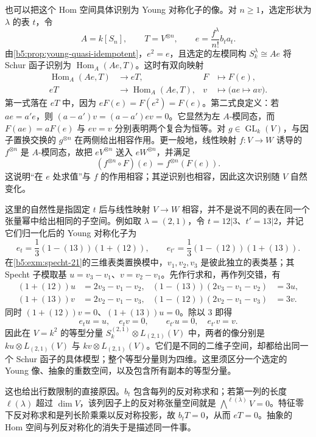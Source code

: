 \ProseParagraphBreak

也可以把这个 Hom 空间具体识别为 Young 对称化子的像。对 \(n\ge1\)，选定形状为 \(\lambda\) 的表 \(t\)，令
\[
	A=k[S_n],\qquad T=V^{\otimes n},\qquad e=\frac{f^\lambda}{n!}b_ta_t.
\]
由\cref{b5:prop:young-quasi-idempotent}，\(e^2=e\)，且选定的左模同构 \(S_k^\lambda\cong Ae\) 将 Schur 函子识别为 \(\operatorname{Hom}_A(Ae,T)\)。这时有双向映射
\[
	\begin{aligned}
		\operatorname{Hom}_A(Ae,T)&\longrightarrow eT, &F&\longmapsto F(e),\\
		eT&\longrightarrow\operatorname{Hom}_A(Ae,T), &v&\longmapsto\bigl(ae\longmapsto av\bigr).
	\end{aligned}
\]
第一式落在 \(eT\) 中，因为 \(eF(e)=F(e^2)=F(e)\)。第二式良定义：若 \(ae=a'e\)，则 \((a-a')v=(a-a')ev=0\)。它显然为左 \(A\)-模同态，而 \(F(ae)=aF(e)\) 与 \(ev=v\) 分别表明两个复合为恒等。对 \(g\in\operatorname{GL}_k(V)\)，与因子置换交换的 \(g^{\otimes n}\) 在两侧给出相容作用。更一般地，线性映射 \(f:V\to W\) 诱导的 \(f^{\otimes n}\) 是 \(A\)-模同态，故把 \(eV^{\otimes n}\) 送入 \(eW^{\otimes n}\)，并满足
\[
	(f^{\otimes n}\circ F)(e)=f^{\otimes n}(F(e)).
\]
这说明“在 \(e\) 处求值”与 \(f\) 的作用相容；其逆识别也相容，因此这次识别随 \(V\) 自然变化。

\ProseParagraphBreak

这里的自然性是指固定 \(t\) 后与线性映射 \(V\to W\) 相容，并不是说不同的表在同一个张量幂中给出相同的子空间。例如取 \(\lambda=(2,1)\)，令 \(t=12|3\)、\(t'=13|2\)，并记它们归一化后的 Young 对称化子为
\[
	e_t=\frac13(1-(13))(1+(12)),\qquad e_{t'}=\frac13(1-(12))(1+(13)).
\]
在\cref{b5:exm:specht-21}的三维表类置换模中，\(v_1,v_2,v_3\) 是彼此独立的表类基；其 Specht 子模取基 \(u=v_3-v_1\)、\(v=v_2-v_1\)。先作行求和，再作列交错，有
\[
	\begin{aligned}
		(1+(12))u&=2v_3-v_1-v_2,& (1-(13))(2v_3-v_1-v_2)&=3u,\\
		(1+(13))v&=2v_2-v_1-v_3,& (1-(12))(2v_2-v_1-v_3)&=3v.
	\end{aligned}
\]
同时 \((1+(12))v=0\)、\((1+(13))u=0\)。除以 \(3\) 即得
\[
	e_tu=u,\quad e_tv=0,\qquad e_{t'}u=0,\quad e_{t'}v=v.
\]
因此在 \(V=k^2\) 的等型分量 \(S_k^{(2,1)}\otimes L_{(2,1)}(V)\) 中，两者的像分别是 \(ku\otimes L_{(2,1)}(V)\) 与 \(kv\otimes L_{(2,1)}(V)\)。它们是不同的二维子空间，却都给出同一个 Schur 函子的具体模型；整个等型分量则为四维。这里须区分一个选定的 Young 像、抽象的重数空间，以及包含所有副本的等型分量。

\ProseParagraphBreak

这也给出行数限制的直接原因。\(b_t\) 包含每列的反对称求和；若第一列的长度 \(\ell(\lambda)\) 超过 \(\dim V\)，该列因子上的反对称张量空间就是 \(\bigwedge^{\ell(\lambda)}V=0\)。特征零下反对称求和是列长阶乘乘以反对称投影，故 \(b_tT=0\)，从而 \(eT=0\)。抽象的 Hom 空间与列反对称化的消失于是描述同一件事。

